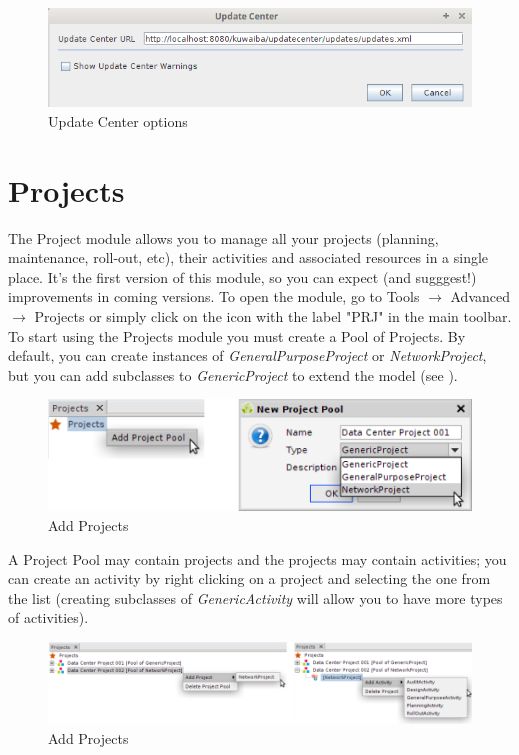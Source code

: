 \documentclass[a4paper]{article}
\begin{document}
		\begin{figure}[h!]
			\centering
			\includegraphics[width=0.7\linewidth]{img/update_center.png}
			\caption{Update Center options}
			\label{fig:update_center_options}
		\end{figure}		
		
		\clearpage		
		\section{Projects}\label{sec:projects}
		
			The Project module allows you to manage all your projects (planning, maintenance, roll-out, etc), their activities and associated resources in a single place. It's the first version of this module, so you can expect (and sugggest!) improvements in coming versions. To open the module, go to Tools $\rightarrow$ Advanced $\rightarrow$ Projects or simply click on the icon with the label "PRJ" in the main toolbar.\\
			To start using the Projects module you must create a Pool of Projects. By default, you can create instances of \textit{GeneralPurposeProject} or \textit{NetworkProject}, but you can add subclasses to \textit{GenericProject} to extend the model (see \textbf{}).
		    
		    \begin{figure}[h!]
		    	\centering
		    	\includegraphics[width=0.5\linewidth]{img/projects_new_project_pool.png}
		    	\caption{Add Projects}	    
		    	\label{fig:projects_actions}
		    \end{figure}
		    		    
		    A Project Pool may contain projects and the projects may contain activities; you can create an activity by right clicking on a project and selecting the one from the list (creating subclasses of \textit{GenericActivity} will allow you to have more types of activities).
		    
		    \begin{figure}[h!]
		    	\centering
		    	\includegraphics[width=0.9\linewidth]{img/projects_new_project_activity.png}
		    	\caption{Add Projects}	    
		    	\label{fig:projects_new_project_activity}
		    \end{figure}		    
		    
\end{document}

